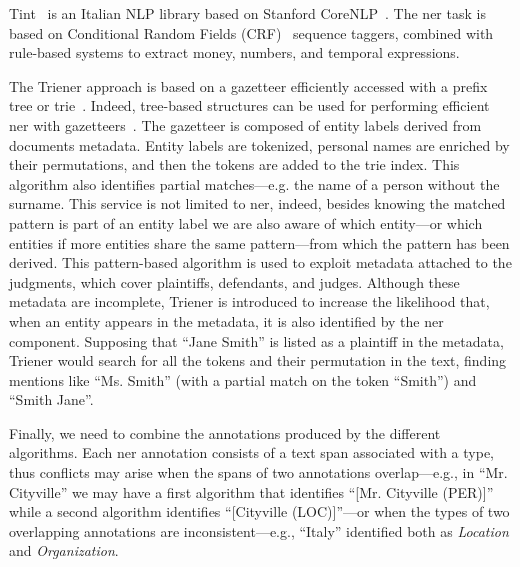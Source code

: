 Tint~\cite{2018tint2} is an Italian NLP library based on Stanford CoreNLP~\cite{manning-EtAl:2014:P14-5}. The \ac{ner} task is based on Conditional Random Fields (CRF)~\cite{Lafferty2001} sequence taggers, combined with rule-based systems to extract money, numbers, and temporal expressions.

The Trie\ac{ner} approach is based on a gazetteer efficiently accessed with a prefix tree or trie~\cite{s-yata-marisa-trie}. Indeed, tree-based structures can be used for performing efficient \ac{ner} with gazetteers~\cite{Nguyen_tree_ner_2014}.
The gazetteer is composed of entity labels derived from documents metadata. Entity labels are tokenized, personal names are enriched by their permutations, and then the tokens are added to the trie index. This algorithm also identifies partial matches---e.g. the name of a person without the surname.
This service is not limited to \ac{ner}, indeed, besides knowing the matched pattern is part of an entity label we are also aware of which entity---or which entities if more entities share the same pattern---from which the pattern has been derived. This pattern-based algorithm is used to exploit metadata attached to the judgments, which cover plaintiffs, defendants, and judges. Although these metadata are incomplete, Trie\ac{ner} is introduced to increase the likelihood that, when an entity appears in the metadata, it is also identified by the \ac{ner} component. Supposing that ``Jane Smith'' is listed as a plaintiff in the metadata, Trie\ac{ner} would search for all the tokens and their permutation in the text, finding mentions like ``Ms. Smith'' (with a partial match on the token ``Smith'') and ``Smith Jane''.


Finally, we need to combine the annotations produced by the different algorithms. Each \ac{ner} annotation consists of a text span associated with a type, thus conflicts may arise when the spans of two annotations overlap---e.g., in ``Mr. Cityville'' we may have a first algorithm that identifies ``[Mr. Cityville (PER)]'' while a second algorithm identifies ``[Cityville (LOC)]''---or when the types of two overlapping annotations are inconsistent---e.g., ``Italy'' identified both as \textit{Location} and \textit{Organization}.

